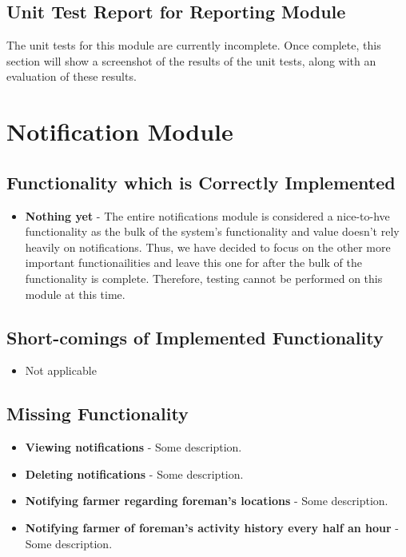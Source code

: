 \documentclass[11pt,fleqn]{book} %
\begin{document}
		\subsection{Unit Test Report for Reporting Module}
			The unit tests for this module are currently incomplete. Once complete, this section will show a screenshot of the results of the unit tests, along with an evaluation of these results.
			
	\section{Notification Module}
		\subsection{Functionality which is Correctly Implemented}
			\begin{itemize}
				\item\textbf{Nothing yet} -
				The entire notifications module is considered a nice-to-hve functionality as the bulk of the system's functionality and value doesn't rely heavily on notifications. Thus, we have decided to focus on the other more important functionailities and leave this one for after the bulk of the functionality is complete. Therefore, testing cannot be performed on this module at this time.
			\end{itemize}
		\subsection{Short-comings of Implemented Functionality}
			\begin{itemize}
				\item{Not applicable}
			\end{itemize}
		\subsection{Missing Functionality}
			\begin{itemize}
				\item\textbf{Viewing notifications} -
				Some description.
				
				\item\textbf{Deleting notifications} -
				Some description.
				
				\item\textbf{Notifying farmer regarding foreman’s locations} -
				Some description.
				
				\item\textbf{Notifying farmer of foreman’s activity history every half an hour} -
				Some description.			
			\end{itemize}
\end{document}
